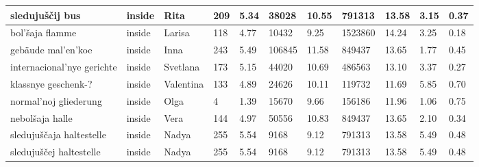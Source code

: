 \begin{longtable}{|p{3cm}|p{1cm}|p{1cm}|R{0.8cm}|R{0.8cm}|R{1.2cm}|R{1cm}|R{1.3cm}|R{1cm}|R{0.8cm}|R{0.6cm}|}
sleduju\v{s}\v{c}ij bus                                            & inside      & Rita      & 209                 & 5.34                      & 38028      & 10.55            & 791313       & 13.58                 & 3.15  & 0.37                 \\ \hline
bol'\v{s}aja flamme                                                & inside      & Larisa    & 118                 & 4.77                      & 10432      & 9.25             & 1523860      & 14.24                 & 3.25  & 0.18                 \\ \hline
geb\"{a}ude mal'en'koe                                             & inside      & Inna      & 243                 & 5.49                      & 106845     & 11.58            & 849437       & 13.65                 & 1.77  & 0.45                 \\ \hline
internacional'nye gerichte                                         & inside      & Svetlana  & 173                 & 5.15                      & 44020      & 10.69            & 486563       & 13.10                 & 3.37  & 0.27                 \\ \hline
klassnye geschenk-?                                                & inside      & Valentina & 133                 & 4.89                      & 24626      & 10.11            & 119732       & 11.69                 & 5.85  & 0.70                 \\ \hline
normal'noj gliederung                                              & inside      & Olga      & 4                   & 1.39                      & 15670      & 9.66             & 156186       & 11.96                 & 1.06  & 0.75                 \\ \hline
nebol\v{s}aja halle                                                & inside      & Vera      & 144                 & 4.97                      & 50556      & 10.83            & 849437       & 13.65                 & 2.10  & 0.34                 \\ \hline
sleduju\v{s}\v{c}aja haltestelle                                   & inside      & Nadya     & 255                 & 5.54                      & 9168       & 9.12             & 791313       & 13.58                 & 5.49  & 0.48                 \\ \hline
sleduju\v{s}\v{c}ej haltestelle                                    & inside      & Nadya     & 255                 & 5.54                      & 9168       & 9.12             & 791313       & 13.58                 & 5.49  & 0.48                 \\ \hline

\end{longtable}
